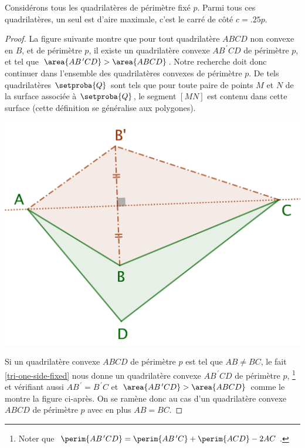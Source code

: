 \begin{fact} \label{quadri}
	Considérons tous les quadrilatères de périmètre fixé $p$. Parmi tous ces quadrilatères, un seul est d'aire maximale, c'est le carré de côté $c = \num{.25} p$.
\end{fact}


\begin{proof}
	La figure suivante montre que pour tout quadrilatère $ABCD$ non convexe en $B$, et de périmètre $p$, il existe un quadrilatère convexe $AB^{\,\prime}CD$ de périmètre $p$, et tel que $\area{AB^{\,\prime}CD} > \area{ABCD}$.
	Notre recherche doit donc continuer dans l'ensemble des quadrilatères convexes de périmètre $p$.
	De tels quadrilatères $\setproba{Q}$ sont tels que pour toute paire de points $M$ et $N$ de la surface associée à $\setproba{Q}$, le segment $[MN]$ est contenu dans cette surface (cette définition se généralise aux polygones).

	\begin{center}
		\includegraphics[scale=.4]{content/quadrilateral/quadrilateral-non-convex.png}
	\end{center}
	
	
	Si un quadrilatère convexe $ABCD$ de périmètre $p$ est tel que $AB \neq BC$, le fait \ref{tri-one-side-fixed} nous donne un quadrilatère convexe $AB^{\,\prime}CD$ de périmètre $p$,%
	\footnote{
		Noter que
		$\perim{AB^{\,\prime}CD} = \perim{AB^{\,\prime}C} + \perim{ACD} - 2 AC$.
	}
	et vérifiant aussi $AB^{\,\prime} = B^{\,\prime}C$ et $\area{AB^{\,\prime}CD} > \area{ABCD}$ comme le montre la figure ci-après.
	On se ramène donc au cas d'un quadrilatère convexe $ABCD$ de périmètre $p$ avec en plus $AB = BC$.


\end{proof}
